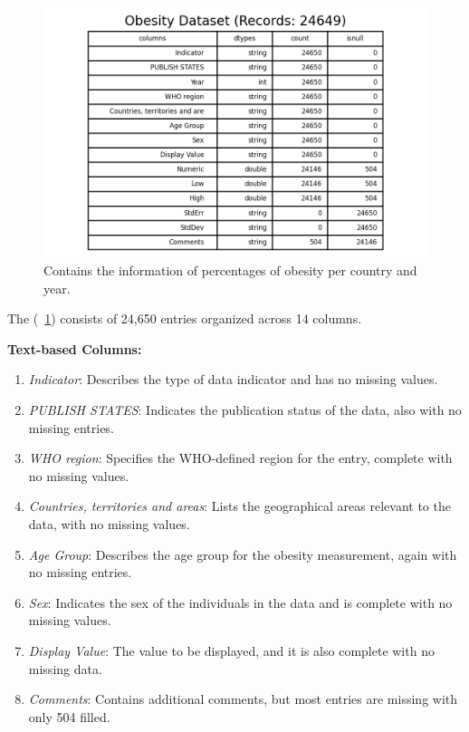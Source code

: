        \subsection{\duDescribeTheData}
            \begin{figure}[H]
                \centering
                \includegraphics[scale=1.3]{images/du_obesity_dataset}
                \caption{Contains the information of percentages of obesity per country and year.}
                \label{fig:du-obesity-datasets}
            \end{figure}

            The \textit{\dsObesity} (\figurename~\ref{fig:du-obesity-datasets}) consists of 24,650 entries organized across 14 columns.

            \textbf{Text-based Columns:}
            \begin{enumerate}
                \item \textit{Indicator}: Describes the type of data indicator and has no missing values.
                \item \textit{PUBLISH STATES}: Indicates the publication status of the data, also with no missing entries.
                \item \textit{WHO region}: Specifies the WHO-defined region for the entry, complete with no missing values.
                \item \textit{Countries, territories and areas}: Lists the geographical areas relevant to the data, with no missing values.
                \item \textit{Age Group}: Describes the age group for the obesity measurement, again with no missing entries.
                \item \textit{Sex}: Indicates the sex of the individuals in the data and is complete with no missing values.
                \item \textit{Display Value}: The value to be displayed, and it is also complete with no missing data.
                \item \textit{Comments}: Contains additional comments, but most entries are missing with only 504 filled.
            \end{enumerate}

